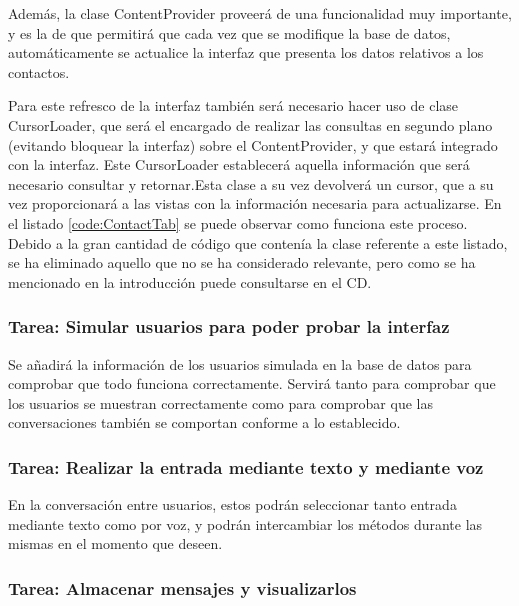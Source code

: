 Además, la clase ContentProvider proveerá de una funcionalidad muy importante, y es la de que permitirá que cada vez que se modifique la base de datos, automáticamente se actualice la interfaz que presenta los datos relativos a los contactos. 


Para este refresco de la interfaz también será necesario hacer uso de clase CursorLoader, que será el encargado de realizar las consultas en segundo plano (evitando bloquear la interfaz) sobre el ContentProvider, y que estará integrado con la interfaz. Este CursorLoader establecerá aquella información que será necesario consultar y retornar.Esta clase a su vez devolverá un cursor, que a su vez proporcionará a las vistas con la información necesaria para actualizarse. En el listado \ref{code:ContactTab} se puede observar como funciona este proceso. Debido a la gran cantidad de código que contenía la clase referente a este listado, se ha eliminado aquello que no se ha considerado relevante, pero como se ha mencionado en la introducción puede consultarse en el CD. 




\subsubsection{Tarea: Simular usuarios para poder probar la interfaz}

Se añadirá la información de los usuarios simulada en la base de datos para comprobar que todo funciona correctamente. Servirá tanto para comprobar que los usuarios se muestran correctamente como para comprobar que las conversaciones también se comportan conforme a lo establecido.


\subsubsection{Tarea: Realizar la entrada mediante texto y mediante voz}

En la conversación entre usuarios, estos podrán seleccionar tanto entrada mediante texto como por voz, y podrán intercambiar los métodos durante las mismas en el momento que deseen.


\subsubsection{Tarea: Almacenar mensajes y visualizarlos}

